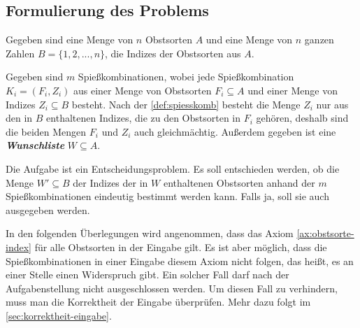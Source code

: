 \subsection{Formulierung des Problems}\label{sec:formulierung}
Gegeben sind eine Menge von $n$ Obstsorten $A$ und eine Menge von $n$ ganzen Zahlen
$B = \{1, 2, ..., n\}$, die Indizes der Obstsorten aus $A$.





Gegeben sind $m$ Spießkombinationen, wobei jede Spießkombination $K_i = (F_i, Z_i)$
aus einer Menge von Obstsorten $F_i \subseteq A$ und einer Menge von Indizes $Z_i \subseteq B$ besteht. 
Nach der \cref{def:spiesskomb} besteht die Menge $Z_i$ nur aus
den in $B$ enthaltenen Indizes, die zu den Obstsorten in $F_i$ gehören, deshalb sind die beiden Mengen
$F_i$ und $Z_i$ auch gleichmächtig. Außerdem gegeben ist eine \textit{\textbf{Wunschliste}} $W \subseteq A$.

Die Aufgabe ist ein Entscheidungsproblem. Es soll entschieden werden,
ob die Menge $W' \subseteq B$ der Indizes der in $W$ enthaltenen Obstsorten anhand der $m$ 
Spießkombinationen eindeutig bestimmt werden kann. Falls ja, soll sie auch ausgegeben werden.

In den folgenden Überlegungen wird angenommen, dass das Axiom \ref{ax:obstsorte-index} für alle
Obstsorten in der Eingabe gilt.
Es ist aber möglich, dass die Spießkombinationen in einer Eingabe diesem Axiom nicht folgen, das heißt,
es an einer Stelle einen Widerspruch gibt.
Ein solcher Fall darf nach der Aufgabenstellung nicht ausgeschlossen werden. 
Um diesen Fall zu verhindern, muss man die Korrektheit der Eingabe überprüfen. 
Mehr dazu folgt im \cref{sec:korrektheit-eingabe}.

